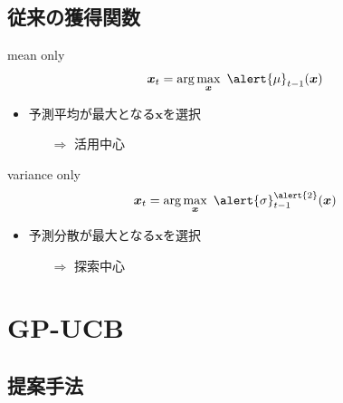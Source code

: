 \documentclass[dvipdfmx, 10.5pt]{beamer}
\begin{document}
\subsection{従来の獲得関数}
\begin{frame}{\insertsubsection}
	\begin{block}{mean only}
		\begin{align*}
			\bm x_t = \arg \max_{\bm x} ~ \alert{\mu}_{t-1}(\bm x)
		\end{align*}
	\end{block}
	\begin{itemize}
		\item 予測平均が最大となる$\bm x$を選択
		\begin{itemize}
			\item[$\Rightarrow$] \alert{活用}中心
		\end{itemize}
	\end{itemize}
	\begin{block}{variance only}
		\begin{align*}
			\bm x_t = \arg \max_{\bm x} ~ \alert{\sigma}_{t-1}^{\alert{2}}(\bm x)
		\end{align*}
	\end{block}
	\begin{itemize}
		\item 予測分散が最大となる$\bm x$を選択
		\begin{itemize}
			\item[$\Rightarrow$] \alert{探索}中心
		\end{itemize}
	\end{itemize}
\end{frame}

\section{GP-UCB}

\subsection{提案手法}
\end{document}
